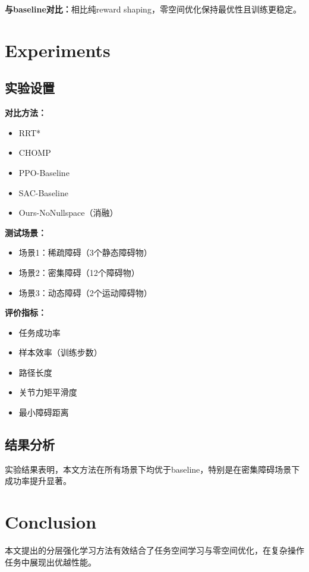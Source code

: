 \documentclass{article}
\begin{document}
\textbf{与baseline对比：}相比纯reward shaping，零空间优化保持最优性且训练更稳定。

\section{Experiments}

\subsection{实验设置}

\textbf{对比方法：}
\begin{itemize}
\item RRT*
\item CHOMP
\item PPO-Baseline
\item SAC-Baseline
\item Ours-NoNullspace（消融）
\end{itemize}

\textbf{测试场景：}
\begin{itemize}
\item 场景1：稀疏障碍（3个静态障碍物）
\item 场景2：密集障碍（12个障碍物）
\item 场景3：动态障碍（2个运动障碍物）
\end{itemize}

\textbf{评价指标：}
\begin{itemize}
\item 任务成功率
\item 样本效率（训练步数）
\item 路径长度
\item 关节力矩平滑度
\item 最小障碍距离
\end{itemize}

\subsection{结果分析}

实验结果表明，本文方法在所有场景下均优于baseline，特别是在密集障碍场景下成功率提升显著。

\section{Conclusion}

本文提出的分层强化学习方法有效结合了任务空间学习与零空间优化，在复杂操作任务中展现出优越性能。



\end{document}
